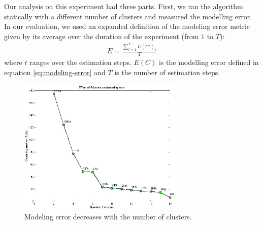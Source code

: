   Our analysis on this experiment had three parts. First, we ran the algorithm statically with a different number of clusters and measured the modelling error. In our evaluation, we used an expanded definition of the modeling error metric given by its average over the duration of the experiment (from $1$ to $T$): 
 \begin{align} 
 E=\frac{\sum^T_{t=1}{E(C')_{t}}}{T} 
  \end{align} 
where $t$ ranges over the estimation steps. $E(C)$ is the modelling error defined in equation \ref{eq:modeling-error} and $T$ is the number of estimation steps. 
\begin{figure}[htbp]
	\centering
	\includegraphics[width=0.7\textwidth]{image/modeling-error-vs-num-cluster.eps}
	\caption[The relationship between the modeling error and the number of clusters.]{Modeling error decreases with the number of clusters.}
	\label{fig:modeling-error-decreases}
\end{figure}

